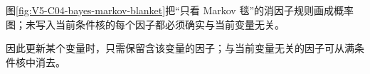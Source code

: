 \documentclass[UTF8,a4paper,11pt,openany]{ctexbook}
\begin{document}
\setcounter{page}{808}
\setcounter{chapter}{33}
\setcounter{figure}{7}
\pagestyle{headings}
图\ref{fig:V5-C04-bayes-markov-blanket}把“只看 Markov 毯”的消因子规则画成概率图；未写入当前条件核的每个因子都必须确实与当前变量无关。

\FloatBarrier
因此更新某个变量时，只需保留含该变量的因子；与当前变量无关的因子可从满条件核中消去。
\end{document}
